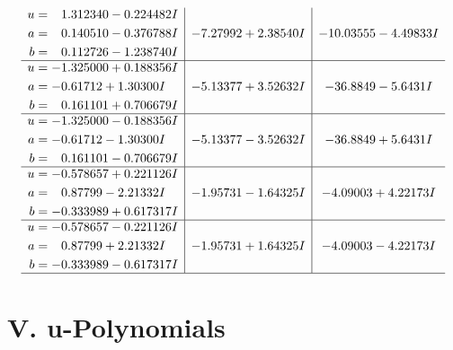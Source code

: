 \documentclass[1p]{elsarticle_modified}
\theoremstyle{definition}
\begin{document}
$$\begin{array}{c|c|c}
\begin{aligned}
u &= \phantom{-}1.312340 - 0.224482 I \\
a &= \phantom{-}0.140510 - 0.376788 I \\
b &= \phantom{-}0.112726 - 1.238740 I\end{aligned}
 & -7.27992 + 2.38540 I & -10.03555 - 4.49833 I \\ \hline\begin{aligned}
u &= -1.325000 + 0.188356 I \\
a &= -0.61712 + 1.30300 I \\
b &= \phantom{-}0.161101 + 0.706679 I\end{aligned}
 & -5.13377 + 3.52632 I & -36.8849 - 5.6431 I \\ \hline\begin{aligned}
u &= -1.325000 - 0.188356 I \\
a &= -0.61712 - 1.30300 I \\
b &= \phantom{-}0.161101 - 0.706679 I\end{aligned}
 & -5.13377 - 3.52632 I & -36.8849 + 5.6431 I \\ \hline\begin{aligned}
u &= -0.578657 + 0.221126 I \\
a &= \phantom{-}0.87799 - 2.21332 I \\
b &= -0.333989 + 0.617317 I\end{aligned}
 & -1.95731 - 1.64325 I & -4.09003 + 4.22173 I \\ \hline\begin{aligned}
u &= -0.578657 - 0.221126 I \\
a &= \phantom{-}0.87799 + 2.21332 I \\
b &= -0.333989 - 0.617317 I\end{aligned}
 & -1.95731 + 1.64325 I & -4.09003 - 4.22173 I\\
 \hline 
 \end{array}$$\newpage
\newpage\renewcommand{\arraystretch}{1}
\centering \section*{ V. u-Polynomials}
\end{document}
